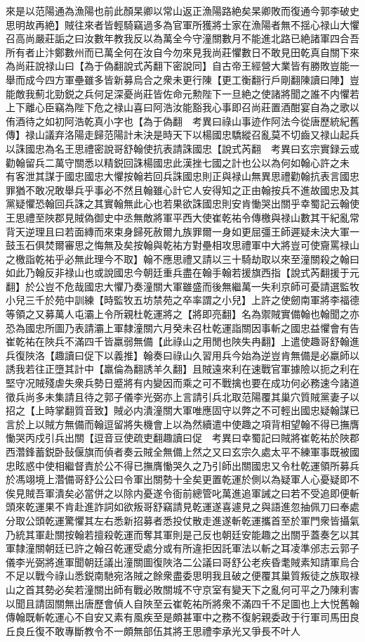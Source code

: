 來是以范陽通為漁陽也前此顏杲卿以常山返正漁陽路絶矣杲卿敗而復通今郭李破史思明故再絶】賊往來者皆輕騎竊過多為官軍所獲將士家在漁陽者無不揺心禄山大懼召高尚嚴莊詬之曰汝數年教我反以為萬全今守潼關數月不能進北路已絶諸軍四合吾所有者止汴鄭數州而已萬全何在汝自今勿來見我尚莊懼數日不敢見田乾真自關下來為尚莊說禄山曰【為于偽翻說式芮翻下密說同】自古帝王經營大業皆有勝敗豈能一舉而成今四方軍壘雖多皆新募烏合之衆未更行陳【更工衡翻行戶剛翻陳讀曰陣】豈能敵我薊北勁鋭之兵何足深憂尚莊皆佐命元勲陛下一旦絶之使諸將聞之誰不内懼若上下離心臣竊為陛下危之禄山喜曰阿浩汝能豁我心事即召尚莊置酒酣宴自為之歌以侑酒待之如初阿浩乾真小字也【為于偽翻　考異曰祿山事迹作阿法今從唐歷統紀舊傳】禄山議弃洛陽走歸范陽計未決是時天下以楊國忠驕縱召亂莫不切齒又禄山起兵以誅國忠為名王思禮密說哥舒翰使抗表請誅國忠【說式芮翻　考異曰玄宗實録云或勸翰留兵二萬守關悉以精鋭回誅楊國忠此漢挫七國之計也公以為何如翰心許之未有客泄其謀于國忠國忠大懼按翰若回兵誅國忠則正與禄山無異思禮勸翰抗表言國忠罪猶不敢况敢舉兵乎事必不然且翰雖心計它人安得知之正由翰按兵不進故國忠及其黨疑懼恐翰回兵誅之其實翰無此心也若果欲誅國忠則安肯慟哭出關乎幸蜀記云翰使王思禮至陜郡見賊偽御史中丞無敵將軍平西大使崔乾祐令傳檄與禄山數其干紀亂常背天逆理且曰若面縳而來束身歸死赦爾九族罪爾一身如更屈彊王師遲疑未決大軍一鼓玉石俱焚爾審思之悔無及矣按翰與乾祐方對壘相攻思禮軍中大將豈可使齎罵禄山之檄詣乾祐乎必無此理今不取】翰不應思禮又請以三十騎劫取以來至潼關殺之翰曰如此乃翰反非禄山也或說國忠今朝廷重兵盡在翰手翰若援旗西指【說式芮翻援于元翻】於公豈不危哉國忠大懼乃奏潼關大軍雖盛而後無繼萬一失利京師可憂請選監牧小兒三千於苑中訓練【時監牧五坊禁苑之卒率謂之小兒】上許之使劒南軍將李福德等領之又募萬人屯灞上令所親杜乾運將之【將即亮翻】名為禦賊實備翰也翰聞之亦恐為國忠所圖乃表請灞上軍隸潼關六月癸未召杜乾運詣關因事斬之國忠益懼會有告崔乾祐在陜兵不滿四千皆羸弱無備【此祿山之用閒也陜失冉翻】上遣使趣哥舒翰進兵復陜洛【趣讀曰促下以義推】翰奏曰祿山久習用兵今始為逆豈肯無備是必羸師以誘我若往正墮其計中【羸倫為翻誘羊久翻】且賊遠來利在速戰官軍據險以扼之利在堅守况賊殘虐失衆兵勢日蹙將有内變因而乘之可不戰擒也要在成功何必務速今諸道徵兵尚多未集請且待之郭子儀李光弼亦上言請引兵北取范陽覆其巢穴質賊黨妻子以招之【上時掌翻質音致】賊必内潰潼關大軍唯應固守以弊之不可輕出國忠疑翰謀已言於上以賊方無備而翰逗留將失機會上以為然續遣中使趣之項背相望翰不得已撫膺慟哭丙戍引兵出關【逗音豆使疏吏翻趣讀曰促　考異曰幸蜀記曰賊將崔乾祐於陜郡西濳鋒蓄鋭卧鼔偃旗而偵者奏云賊全無備上然之又曰玄宗久處太平不練軍事既被國忠眩惑中使相繼督責於公不得已撫膺慟哭久之乃引師出關國忠又令杜乾運領所募兵於馮翊境上濳備哥舒公公曰令軍出關勢十全矣更置乾運於側以為疑軍人心憂疑即不俟見賊吾軍潰矣必當併之以除内憂遂令衙前總管叱萬進追軍誡之曰若不受追即便斬頭來乾運果不肯赴進詐詞如欲叛哥舒竊請見乾運遂喜遽見之與語進忽抽佩刀曰奉處分取公頭乾運驚懼其左右悉新招募者悉投仗散走進遂斬乾運攜首至於軍門衆皆攝氣乃統其軍赴關按翰若擅殺乾運而奪其軍則是己反也朝廷安能趣之出關乎蓋奏乞以其軍隸潼關朝廷已許之翰召乾運受處分或有所違拒因託軍法以斬之耳凌準邠志云郭子儀李光弼將進軍聞朝廷議出潼關圖復陜洛二公議曰哥舒公老疾昏耄賊素知請軍烏合不足以戰今祿山悉鋭南馳宛洛賊之餘衆盡委思明我且破之便覆其巢質叛徒之族取禄山之首其勢必矣若潼關出師有戰必敗關城不守京室有變天下之亂何可平之乃陳利害以聞且請固關無出唐歷會偵人自陜至云崔乾祐所將衆不滿四千不足圖也上大悦舊翰傳翰既斬乾運心不自安又素有風疾至是頗甚軍中之務不復躬親委政于行軍司馬田良丘良丘復不敢專斷教令不一頗無部伍其將王思禮李承光又爭長不叶人